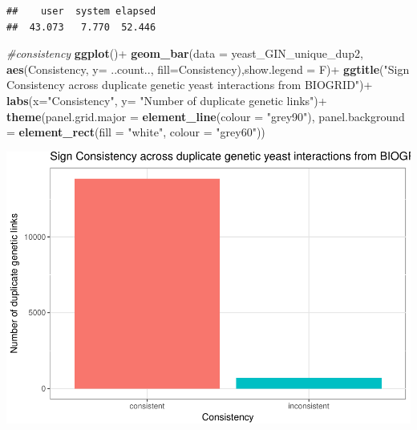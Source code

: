 \documentclass[12pt,]{article}
\newenvironment{Shaded}{\begin{snugshade}}{\end{snugshade}}
\newcommand{\KeywordTok}[1]{\textcolor[rgb]{0.13,0.29,0.53}{\textbf{{#1}}}}
\newcommand{\DataTypeTok}[1]{\textcolor[rgb]{0.13,0.29,0.53}{{#1}}}
\newcommand{\StringTok}[1]{\textcolor[rgb]{0.31,0.60,0.02}{{#1}}}
\newcommand{\CommentTok}[1]{\textcolor[rgb]{0.56,0.35,0.01}{\textit{{#1}}}}
\newcommand{\NormalTok}[1]{{#1}}
\begin{document}
\begin{verbatim}
##    user  system elapsed 
##  43.073   7.770  52.446
\end{verbatim}

\begin{Shaded}
\begin{Highlighting}[]
\CommentTok{#consistency}
\KeywordTok{ggplot}\NormalTok{()+}
\StringTok{  }\KeywordTok{geom_bar}\NormalTok{(}\DataTypeTok{data =} \NormalTok{yeast_GIN_unique_dup2, }\KeywordTok{aes}\NormalTok{(Consistency, }\DataTypeTok{y=} \NormalTok{..count.., }\DataTypeTok{fill=}\NormalTok{Consistency),}\DataTypeTok{show.legend =} \NormalTok{F)+}
\StringTok{  }\KeywordTok{ggtitle}\NormalTok{(}\StringTok{"Sign Consistency across duplicate genetic yeast interactions from BIOGRID"}\NormalTok{)+}
\StringTok{  }\KeywordTok{labs}\NormalTok{(}\DataTypeTok{x=}\StringTok{"Consistency"}\NormalTok{, }\DataTypeTok{y=} \StringTok{"Number of duplicate genetic links"}\NormalTok{)+}
\StringTok{  }\KeywordTok{theme}\NormalTok{(}\DataTypeTok{panel.grid.major =} \KeywordTok{element_line}\NormalTok{(}\DataTypeTok{colour =} \StringTok{"grey90"}\NormalTok{), }\DataTypeTok{panel.background =} \KeywordTok{element_rect}\NormalTok{(}\DataTypeTok{fill =} \StringTok{"white"}\NormalTok{, }\DataTypeTok{colour =} \StringTok{"grey60"}\NormalTok{))}
\end{Highlighting}
\end{Shaded}

\includegraphics{yeast_GIN_files/figure-latex/unnamed-chunk-10-1.pdf}

\begin{Shaded}
\end{Shaded}
\end{document}
